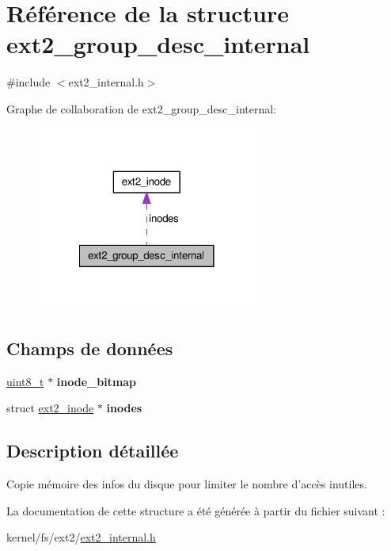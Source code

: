 \hypertarget{structext2__group__desc__internal}{\section{Référence de la structure ext2\-\_\-group\-\_\-desc\-\_\-internal}
\label{structext2__group__desc__internal}
}


{\ttfamily \#include $<$ext2\-\_\-internal.\-h$>$}



Graphe de collaboration de ext2\-\_\-group\-\_\-desc\-\_\-internal\-:
\nopagebreak
\begin{figure}[H]
\begin{center}
\leavevmode
\includegraphics[width=206pt]{structext2__group__desc__internal__coll__graph}
\end{center}
\end{figure}
\subsection*{Champs de données}
\begin{DoxyCompactItemize}
\item 
\hypertarget{structext2__group__desc__internal_a5b3cee6954ef4ed21c238b46d389b9bf}{\hyperlink{kernel_2include_2types_8h_aba7bc1797add20fe3efdf37ced1182c5}{uint8\-\_\-t} $\ast$ {\bfseries inode\-\_\-bitmap}}\label{structext2__group__desc__internal_a5b3cee6954ef4ed21c238b46d389b9bf}

\item 
\hypertarget{structext2__group__desc__internal_a690f836bfb2c8de04ae2b1753134f8a7}{struct \hyperlink{structext2__inode}{ext2\-\_\-inode} $\ast$ {\bfseries inodes}}\label{structext2__group__desc__internal_a690f836bfb2c8de04ae2b1753134f8a7}

\end{DoxyCompactItemize}


\subsection{Description détaillée}
Copie mémoire des infos du disque pour limiter le nombre d'accès inutiles. 

La documentation de cette structure a été générée à partir du fichier suivant \-:\begin{DoxyCompactItemize}
\item 
kernel/fs/ext2/\hyperlink{ext2__internal_8h}{ext2\-\_\-internal.\-h}\end{DoxyCompactItemize}
